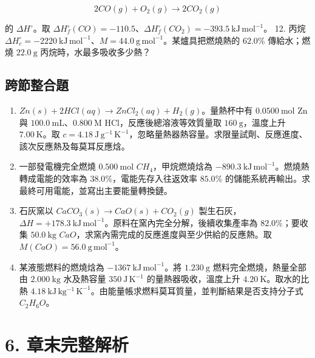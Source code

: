 \documentclass[11pt,a4paper]{article}
\providecommand{\tightlist}{%
  \setlength{\itemsep}{0pt}\setlength{\parskip}{0pt}}
\begin{document}
\[
   2CO(g)+O_2(g)\rightarrow2CO_2(g)
   \]

的 \(\Delta H^\circ\)。取 \(\Delta H_f^\circ(CO)=-110.5\)、\(\Delta H_f^\circ(CO_2)=-393.5\ \mathrm{kJ\,mol^{-1}}\)。
12. 丙烷 \(\Delta H_c^\circ=-2220\ \mathrm{kJ\,mol^{-1}}\)、\(M=44.0\ \mathrm{g\,mol^{-1}}\)。某爐具把燃燒熱的 \(62.0\%\) 傳給水；燃燒 \(22.0\ \mathrm g\) 丙烷時，水最多吸收多少熱？

\subsection{跨節整合題}\label{ux8de8ux7bc0ux6574ux5408ux984c}

\begin{enumerate}
\def\labelenumi{\arabic{enumi}.}
\setcounter{enumi}{12}
\tightlist
\item
  \(Zn(s)+2HCl(aq)\rightarrow ZnCl_2(aq)+H_2(g)\)。量熱杯中有 \(0.0500\ \mathrm{mol}\) Zn 與 \(100.0\ \mathrm{mL}\)、\(0.800\ \mathrm M\) HCl，反應後總溶液等效質量取 \(160\ \mathrm g\)，溫度上升 \(7.00\ \mathrm K\)。取 \(c=4.18\ \mathrm{J\,g^{-1}\,K^{-1}}\)，忽略量熱器熱容量。求限量試劑、反應進度、該次反應熱及每莫耳反應焓。
\item
  一部發電機完全燃燒 \(0.500\ \mathrm{mol}\) \(CH_4\)，甲烷燃燒焓為 \(-890.3\ \mathrm{kJ\,mol^{-1}}\)。燃燒熱轉成電能的效率為 \(38.0\%\)，電能先存入往返效率 \(85.0\%\) 的儲能系統再輸出。求最終可用電能，並寫出主要能量轉換鏈。
\item
  石灰窯以 \(CaCO_3(s)\rightarrow CaO(s)+CO_2(g)\) 製生石灰，\(\Delta H=+178.3\ \mathrm{kJ\,mol^{-1}}\)。原料在窯內完全分解，後續收集產率為 \(82.0\%\)；要收集 \(50.0\ \mathrm{kg}\) \(CaO\)，求窯內需完成的反應進度與至少供給的反應熱。取 \(M(CaO)=56.0\ \mathrm{g\,mol^{-1}}\)。
\item
  某液態燃料的燃燒焓為 \(-1367\ \mathrm{kJ\,mol^{-1}}\)。將 \(1.230\ \mathrm g\) 燃料完全燃燒，熱量全部由 \(2.000\ \mathrm{kg}\) 水及熱容量 \(350\ \mathrm{J\,K^{-1}}\) 的量熱器吸收，溫度上升 \(4.20\ \mathrm K\)。取水的比熱 \(4.18\ \mathrm{kJ\,kg^{-1}\,K^{-1}}\)。由能量帳求燃料莫耳質量，並判斷結果是否支持分子式 \(C_2H_6O\)。
\end{enumerate}

\section{6. 章末完整解析}\label{ux7ae0ux672bux5b8cux6574ux89e3ux6790}
\end{document}
